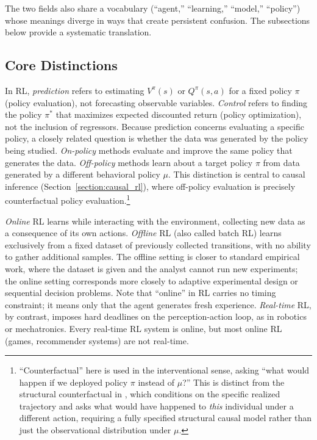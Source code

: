 The two fields also share a vocabulary (``agent,'' ``learning,'' ``model,'' ``policy'') whose meanings diverge in ways that create persistent confusion. The subsections below provide a systematic translation.

\subsection{Core Distinctions}
\label{subsec:core_distinctions}

In RL, \textit{prediction} refers to estimating $V^\pi(s)$ or $Q^\pi(s,a)$ for a fixed policy $\pi$ (policy evaluation), not forecasting observable variables. \textit{Control} refers to finding the policy $\pi^*$ that maximizes expected discounted return (policy optimization), not the inclusion of regressors. Because prediction concerns evaluating a specific policy, a closely related question is whether the data was generated by the policy being studied. \textit{On-policy} methods evaluate and improve the same policy that generates the data. \textit{Off-policy} methods learn about a target policy $\pi$ from data generated by a different behavioral policy $\mu$. This distinction is central to causal inference (Section~\ref{section:causal_rl}), where off-policy evaluation is precisely counterfactual policy evaluation.\footnote{``Counterfactual'' here is used in the interventional sense, asking ``what would happen if we deployed policy $\pi$ instead of $\mu$?'' This is distinct from the structural counterfactual in \citet{oberst2019counterfactual}, which conditions on the specific realized trajectory and asks what would have happened to \textit{this} individual under a different action, requiring a fully specified structural causal model rather than just the observational distribution under $\mu$.}

\textit{Online} RL learns while interacting with the environment, collecting new data as a consequence of its own actions. \textit{Offline} RL (also called batch RL) learns exclusively from a fixed dataset of previously collected transitions, with no ability to gather additional samples. The offline setting is closer to standard empirical work, where the dataset is given and the analyst cannot run new experiments; the online setting corresponds more closely to adaptive experimental design or sequential decision problems. Note that ``online'' in RL carries no timing constraint; it means only that the agent generates fresh experience. \textit{Real-time} RL, by contrast, imposes hard deadlines on the perception-action loop, as in robotics or mechatronics. Every real-time RL system is online, but most online RL (games, recommender systems) are not real-time.

